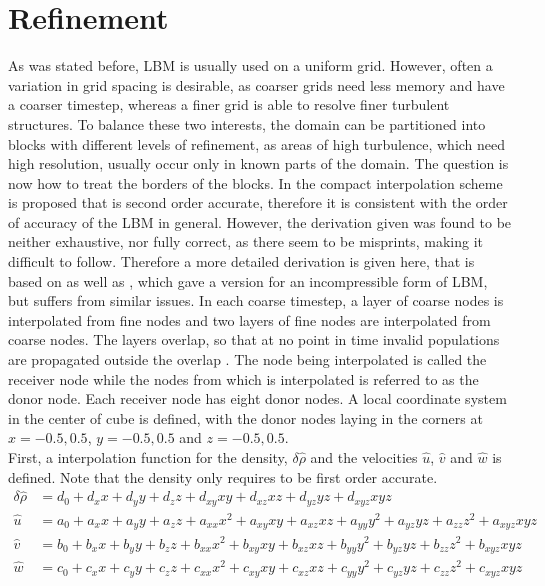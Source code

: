 \section{Refinement}
\label{app:refinement}
As was stated before, LBM is usually used on a uniform grid. However, often a variation in grid spacing is desirable, as coarser grids need less memory and have a coarser timestep, whereas a finer grid is able to resolve finer turbulent structures. To balance these two interests, the domain can be partitioned into blocks with different levels of refinement, as areas of high turbulence, which need high resolution, usually occur only in known parts of the domain. The question is now how to treat the borders of the blocks. In \cite{schonherr_towards_2015} the compact interpolation scheme is proposed that is second order accurate, therefore it is consistent with the order of accuracy of the LBM in general. However, the derivation given was found to be neither exhaustive, nor fully correct, as there seem to be misprints, making it difficult to follow. Therefore a more detailed derivation is given here, that is based on \cite{schonherr_towards_2015} as well as \cite{kutscher_multiscale_2019}, which gave a version for an incompressible form of LBM, but suffers from similar issues. In each coarse timestep, a layer of coarse nodes is interpolated from fine nodes and two layers of fine nodes are interpolated from coarse nodes. The layers overlap, so that at no point in time invalid populations are propagated outside the overlap \cite{schonherr_towards_2015}. The node being interpolated is called the receiver node while the nodes from which is interpolated is referred to as the donor node. Each receiver node has eight donor nodes. A local coordinate system in the center of cube is defined, with the donor nodes laying in the corners at $x={-0.5, 0.5}$, $y={-0.5,0.5}$ and $z={-0.5,0.5}$. \\First, a interpolation function for the density, $\delta \hat{\rho}$ and the velocities $\hat{u}$, $\hat{v}$ and $\hat{w}$ is defined. Note that the density only requires to be first order accurate.
\begin{align}
	 \delta \hat{\rho} &= d_0 + d_x x + d_y y + d_z z + d_{xy}xy + d_{xz}xz + d_{yz}yz + d_{xyz}xyz \\
	\hat{u} &= a_0 + a_x x + a_y y + a_z z + a_{xx} x^2 + a_{xy} xy + a_{xz} xz + a_{yy} y^2 + a_{yz} yz + a_{zz} z^2 + a_{xyz}xyz \\
	\hat{v} &= b_0 + b_x x + b_y y + b_z z + b_{xx} x^2 + b_{xy} xy + b_{xz} xz + b_{yy} y^2 + b_{yz} yz + b_{zz} z^2 + b_{xyz}xyz \\
	\hat{w} &= c_0 + c_x x + c_y y + c_z z + c_{xx} x^2 + c_{xy} xy + c_{xz} xz + c_{yy} y^2 + c_{yz} yz + c_{zz} z^2 + c_{xyz}xyz
\end{align}
